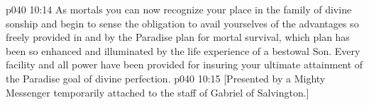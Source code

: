 \vs p040 10:14 As mortals you can now recognize your place in the family of divine sonship and begin to sense the obligation to avail yourselves of the advantages so freely provided in and by the Paradise plan for mortal survival, which plan has been so enhanced and illuminated by the life experience of a bestowal Son. Every facility and all power have been provided for insuring your ultimate attainment of the Paradise goal of divine perfection.
\vsetoff
\vs p040 10:15 [Presented by a Mighty Messenger temporarily attached to the staff of Gabriel of Salvington.]
